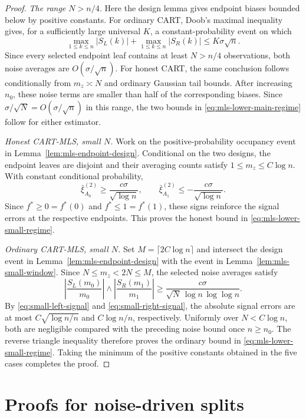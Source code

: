 \documentclass[11pt]{article}
\theoremstyle{plain}
\theoremstyle{definition}
\theoremstyle{remark}
\theoremstyle{plain}
\newcommand{\1}{\mathbbm{1}}
\begin{document}
\begin{proof}
\medskip\noindent
\textit{The range $N>n/4$.}
Here the design lemma gives endpoint biases bounded below by positive
constants. For ordinary CART, Doob's maximal inequality gives, for a
sufficiently large universal $K$, a constant-probability event on which
\[
 \max_{1\le k\le n}|S_L(k)|
 +\max_{1\le k\le n}|S_R(k)|
 \le K\sigma\sqrt n.
\]
Since every selected endpoint leaf contains at least $N>n/4$ observations,
both noise averages are $O(\sigma/\sqrt n)$. For honest CART, the same
conclusion follows conditionally from $m_z\asymp N$ and ordinary Gaussian
tail bounds. After increasing $n_0$, these noise terms are smaller
than half of the corresponding biases. Since
$\sigma/\sqrt N=O(\sigma/\sqrt n)$ in this range, the two bounds in
\eqref{eq:mls-lower-main-regime} follow for either estimator.

\medskip\noindent
\textit{Honest CART-MLS, small $N$.}
Work on the positive-probability occupancy event in
Lemma~\ref{lem:mls-endpoint-design}. Conditional on the two designs, the
endpoint leaves are disjoint and their averaging counts satisfy
$1\le m_z\le C\log n$. With constant conditional probability,
\[
 \bar\xi_{A_0}^{(2)}\ge\frac{c\sigma}{\sqrt{\log n}},
 \qquad
 \bar\xi_{A_1}^{(2)}\le-\frac{c\sigma}{\sqrt{\log n}}.
\]
Since $f^*\ge0=f^*(0)$ and $f^*\le1=f^*(1)$, these signs reinforce the
signal errors at the respective endpoints. This proves the honest bound in
\eqref{eq:mls-lower-small-regime}.

\medskip\noindent
\textit{Ordinary CART-MLS, small $N$.}
Set $M=\lceil2C\log n\rceil$ and intersect the design event in
Lemma~\ref{lem:mls-endpoint-design} with the event in
Lemma~\ref{lem:mls-small-window}. Since $N\le m_z<2N\le M$, the selected
noise averages satisfy
\[
 \left|\frac{S_L(m_0)}{m_0}\right|
 \wedge
 \left|\frac{S_R(m_1)}{m_1}\right|
 \ge
 \frac{c\sigma}{\sqrt N\,\log n\,\log\log n}.
\]
By \eqref{eq:small-left-signal} and \eqref{eq:small-right-signal}, the
absolute signal errors are at most
$C\sqrt{\log n/n}$ and $C\log n/n$, respectively. Uniformly over
$N<C\log n$, both are negligible compared with the preceding noise bound
once $n\ge n_0$. The reverse triangle inequality therefore proves
the ordinary bound in \eqref{eq:mls-lower-small-regime}. Taking the minimum
of the positive constants obtained in the five cases completes the proof.
\end{proof}

\section{Proofs for noise-driven splits}
\label{app:noise-driven-splits}
\end{document}
